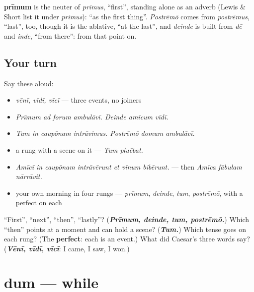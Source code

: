 \begin{cousinweb}
\textbf{prīmum} is the neuter of \emph{prīmus}, \textquotedblleft{}first\textquotedblright{}, standing alone as an adverb (Lewis \& Short list it under \emph{primus}): \textquotedblleft{}as the first thing\textquotedblright{}. \emph{Postrēmō} comes from \emph{postrēmus}, \textquotedblleft{}last\textquotedblright{}, too, though it is the ablative, \textquotedblleft{}at the last\textquotedblright{}, and \emph{deinde} is built from \emph{dē} and \emph{inde}, \textquotedblleft{}from there\textquotedblright{}: from that point on.
\end{cousinweb}

\subsection*{Your turn}
Say these aloud:

\begin{itemize}
\raggedright
  \item \emph{vēnī, vīdī, vīcī} — three events, no joiners
  \item \emph{Prīmum ad forum ambulāvī. Deinde amīcum vīdī.}
  \item \emph{Tum in caupōnam intrāvimus. Postrēmō domum ambulāvī.}
  \item a rung with a scene on it — \emph{Tum pluēbat.}
  \item \emph{Amīcī in caupōnam intrāvērunt et vīnum bibērunt.} — then \emph{Amīca fābulam nārrāvit.}
  \item your own morning in four rungs — \emph{prīmum}, \emph{deinde}, \emph{tum}, \emph{postrēmō}, with a perfect on each
\end{itemize}

\begin{tcolorbox}[breakable,colback=teal!4,colframe=teal!35!black,title={Before you move on}]
\textquotedblleft{}First\textquotedblright{}, \textquotedblleft{}next\textquotedblright{}, \textquotedblleft{}then\textquotedblright{}, \textquotedblleft{}lastly\textquotedblright{}? (\emph{\textbf{Prīmum, deinde, tum, postrēmō.}}) Which \textquotedblleft{}then\textquotedblright{} points at a moment and can hold a scene? (\emph{\textbf{Tum.}}) Which tense goes on each rung? (The \textbf{perfect}: each is an event.) What did Caesar's three words say? (\emph{\textbf{Vēnī, vīdī, vīcī}}: I came, I saw, I won.)
\end{tcolorbox}
\section[dum]{dum — while}

